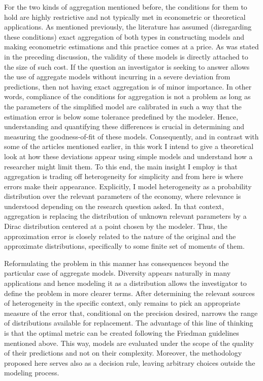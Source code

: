 \documentclass[english, a4paper, 12pt]{article}
\begin{document}
For the two kinds of aggregation mentioned before, the conditions for them to hold are highly restrictive and not typically met in econometric or theoretical applications. As mentioned previously, the literature has assumed (disregarding these conditions) exact aggregation of both types in constructing models and making econometric estimations and this practice comes at a price. As was stated in the preceding discussion, the validity of these models is directly attached to the size of such cost. If the question an investigator is seeking to answer allows the use of aggregate models without incurring in a severe deviation from predictions, then not having exact aggregation is of minor importance. In other words, compliance of the conditions for aggregation is not a problem as long as the parameters of the simplified model are calibrated in such a way that the estimation error is below some tolerance predefined by the modeler. Hence, understanding and quantifying these differences is crucial in determining and measuring the goodness-of-fit of these models. Consequently, and in contrast with some of the articles mentioned earlier, in this work I intend to give a theoretical look at how these deviations appear using simple models and understand how a researcher might limit them. To this end, the main insight I employ is that aggregation is trading off heterogeneity for simplicity and from here is where errors make their appearance. Explicitly, I model heterogeneity as a probability distribution over the relevant parameters of the economy, where relevance is understood depending on the research question asked. In that context, aggregation is replacing the distribution of unknown relevant parameters by a Dirac distribution centered at a point chosen by the modeler. Thus, the approximation error is closely related to the nature of the original and the approximate distributions, specifically to some finite set of moments of them.

Reformulating the problem in this manner has consequences beyond the particular case of aggregate models. Diversity appears naturally in many applications and hence modeling it as a distribution allows the investigator to define the problem in more clearer terms. After determining the relevant sources of heterogeneity in the specific context, only remains to pick an appropriate measure of the error that, conditional on the precision desired, narrows the range of distributions available for replacement. The advantage of this line of thinking is that the optimal metric can be created following the Friedman guidelines mentioned above. This way, models are evaluated under the scope of the quality of their predictions and not on their complexity. Moreover, the methodology proposed here serves also as a decision rule, leaving arbitrary choices outside the modeling process.
\end{document}
